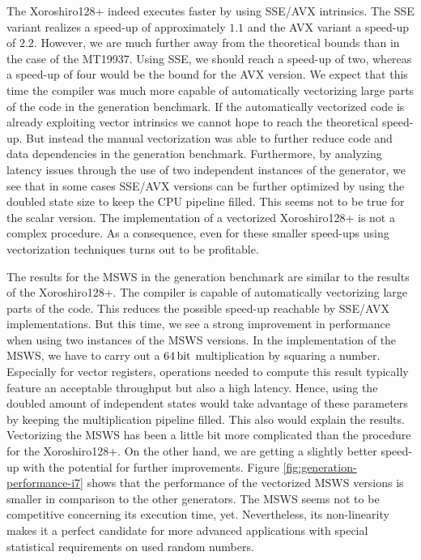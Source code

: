 \documentclass{stdlocal}
\begin{document}
    The Xoroshiro128+ indeed executes faster by using SSE/AVX intrinsics.
    The SSE variant realizes a speed-up of approximately $1.1$ and the AVX variant a speed-up of $2.2$.
    However, we are much further away from the theoretical bounds than in the case of the MT19937.
    Using SSE, we should reach a speed-up of two, whereas a speed-up of four would be the bound for the AVX version.
    We expect that this time the compiler was much more capable of automatically vectorizing large parts of the code in the generation benchmark.
    If the automatically vectorized code is already exploiting vector intrinsics we cannot hope to reach the theoretical speed-up.
    But instead the manual vectorization was able to further reduce code and data dependencies in the generation benchmark.
    Furthermore, by analyzing latency issues through the use of two independent instances of the generator, we see that in some cases SSE/AVX versions can be further optimized by using the doubled state size to keep the CPU pipeline filled.
    This seems not to be true for the scalar version.
    The implementation of a vectorized Xoroshiro128+ is not a complex procedure.
    As a consequence, even for these smaller speed-ups using vectorization techniques turns out to be profitable.

    The results for the MSWS in the generation benchmark are similar to the results of the Xoroshiro128+.
    The compiler is capable of automatically vectorizing large parts of the code.
    This reduces the possible speed-up reachable by SSE/AVX implementations.
    But this time, we see a strong improvement in performance when using two instances of the MSWS versions.
    In the implementation of the MSWS, we have to carry out a $64\, \mathrm{bit}$ multiplication by squaring a number.
    Especially for vector registers, operations needed to compute this result typically feature an acceptable throughput but also a high latency.
    Hence, using the doubled amount of independent states would take advantage of these parameters by keeping the multiplication pipeline filled.
    This also would explain the results.
    Vectorizing the MSWS has been a little bit more complicated than the procedure for the Xoroshiro128+.
    On the other hand, we are getting a slightly better speed-up with the potential for further improvements.
    Figure \ref{fig:generation-performance-i7} shows that the performance of the vectorized MSWS versions is smaller in comparison to the other generators.
    The MSWS seems not to be competitive concerning its execution time, yet.
    Nevertheless, its non-linearity makes it a perfect candidate for more advanced applications with special statistical requirements on used random numbers.
\end{document}
